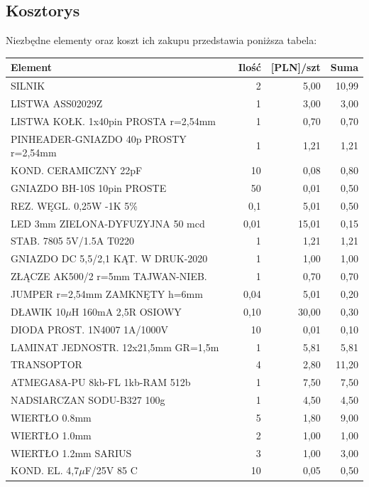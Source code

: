\documentclass[11pt,a4paper]{article}
\begin{document}
\vspace{3cm}
\subsection{Kosztorys}
Niezbędne elementy oraz koszt ich zakupu przedstawia poniższa tabela:
\begin{longtable}{|l|r|r|r|}
  \hline
  Element & Ilość & [PLN]/szt & Suma \\
  \hline \hline
  SILNIK & 2 & 5,00 & 10,99\\
  LISTWA ASS02029Z & 1 & 3,00 & 3,00 \\
  LISTWA KOŁK. 1x40pin PROSTA r=2,54mm & 1 & 0,70 & 0,70 \\
  PINHEADER-GNIAZDO 40p PROSTY r=2,54mm & 1 & 1,21 & 1,21 \\
  KOND. CERAMICZNY 22pF & 10 & 0,08 & 0,80 \\
  GNIAZDO BH-10S 10pin PROSTE & 50 & 0,01 & 0,50 \\
  REZ. WĘGL. 0,25W -1K 5\% & 0,1 & 5,01 & 0,50 \\
  LED 3mm ZIELONA-DYFUZYJNA 50 mcd & 0,01 & 15,01 & 0,15 \\
  STAB. 7805 5V/1.5A T0220 & 1 & 1,21 & 1,21 \\
  GNIAZDO DC 5,5/2,1 KĄT. W DRUK-2020 & 1 & 1,00 & 1,00 \\
  ZŁĄCZE AK500/2 r=5mm TAJWAN-NIEB. & 1 & 0,70 & 0,70 \\
  JUMPER r=2,54mm ZAMKNĘTY h=6mm & 0,04 & 5,01 & 0,20 \\
  DŁAWIK 10$\mu$H 160mA 2,5R OSIOWY & 0,10 & 30,00 & 0,30 \\
  DIODA PROST. 1N4007 1A/1000V & 10 & 0,01 & 0,10 \\
  LAMINAT JEDNOSTR. 12x21,5mm GR=1,5m & 1 & 5,81 & 5,81 \\
  TRANSOPTOR & 4 & 2,80 & 11,20 \\
  ATMEGA8A-PU 8kb-FL 1kb-RAM 512b & 1 & 7,50 & 7,50 \\
  NADSIARCZAN SODU-B327 100g & 1 & 4,50 & 4,50 \\
  WIERTŁO 0.8mm & 5 & 1,80 & 9,00 \\
  WIERTŁO 1.0mm & 2 & 1,00 & 1,00 \\
  WIERTŁO 1.2mm SARIUS & 3 & 1,00 & 3,00 \\
  KOND. EL. 4,7$\mu$F/25V 85 C & 10 & 0,05 & 0,50 \\ 

\end{longtable}
\end{document}
